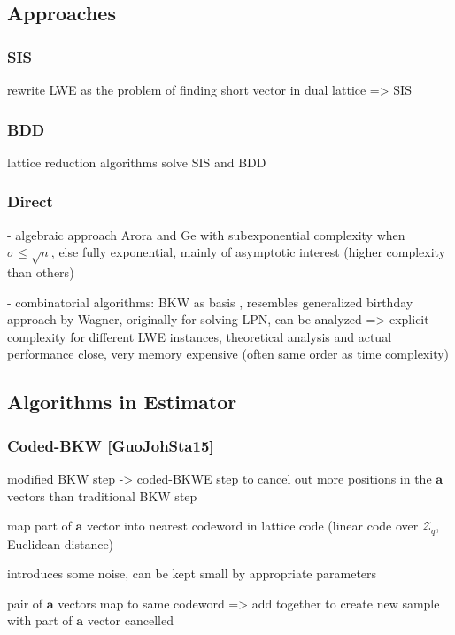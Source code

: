\documentclass[
  a4paper,  %
  twoside,  %
  bibliography=totoc,
  headsepline,
  cleardoublepage=empty,
  parskip=half,
  draft=false
]{scrbook}
\begin{document}
\subsection{Approaches}
\subsubsection{SIS}
rewrite LWE as the problem of finding short vector in dual lattice => SIS
\subsubsection{BDD}

lattice reduction algorithms solve SIS and BDD 
\subsubsection{Direct}

- algebraic approach Arora and Ge with subexponential complexity when $\sigma \leq \sqrt{n}$, else fully exponential, mainly of asymptotic interest (higher complexity than others)

- combinatorial algorithms: BKW as basis \cite{BKW03}, resembles generalized birthday approach by Wagner, %
originally for solving LPN, can be analyzed => explicit complexity for different LWE instances, theoretical analysis and actual performance close,
very memory expensive (often same order as time complexity) 

\subsection{Algorithms in Estimator}
\subsubsection{Coded-BKW [GuoJohSta15]}
modified BKW step -> coded-BKWE step to cancel out more positions in the $\textbf{a}$ vectors than traditional BKW step

map part of $\textbf{a}$ vector into nearest codeword in lattice code (linear code over $\mathcal{Z}_q$, Euclidean distance)

introduces some noise, can be kept small by appropriate parameters

pair of $\textbf{a}$ vectors map to same codeword => add together to create new sample with part of $\textbf{a}$ vector cancelled
\end{document}
